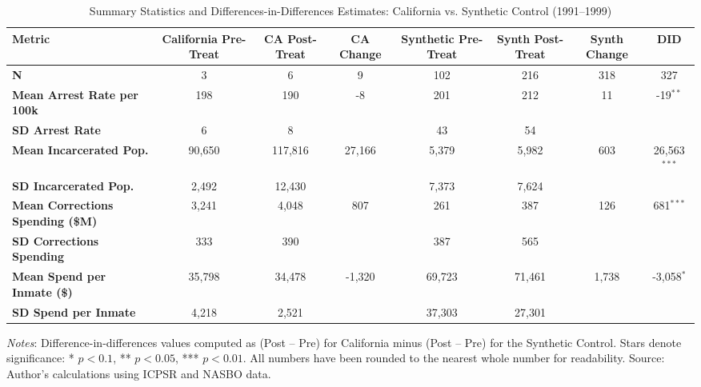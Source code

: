 \documentclass[12pt]{article}
\begin{document}
\begin{landscape}
\begin{center}
\begin{table}[ht]
\scriptsize
\centering
\renewcommand{\arraystretch}{1.2}
\begin{tabular}{lccccccc}
\toprule
\textbf{Metric} & \textbf{California Pre-Treat} & \textbf{CA Post-Treat} & \textbf{CA Change} & \textbf{Synthetic Pre-Treat} & \textbf{Synth Post-Treat} & \textbf{Synth Change} & \textbf{DID} \\
\midrule
\textbf{N} & 3 & 6 & 9 & 102 & 216 & 318 & 327 \\
\textbf{Mean Arrest Rate per 100k} & 198 & 190 & -8 & 201 & 212 & 11 & -19$^{**}$ \\
\textbf{SD Arrest Rate} & 6 & 8 &  & 43 & 54 &  & \\
\textbf{Mean Incarcerated Pop.} & 90,650 & 117,816 & 27,166 & 5,379 & 5,982 & 603 & 26,563$^{***}$ \\
\textbf{SD Incarcerated Pop.} & 2,492 & 12,430 &  & 7,373 & 7,624 &  & \\
\textbf{Mean Corrections Spending (\$M)} & 3,241 & 4,048 & 807 & 261 & 387 & 126 & 681$^{***}$ \\
\textbf{SD Corrections Spending} & 333 & 390 &  & 387 & 565 &  & \\
\textbf{Mean Spend per Inmate (\$)} & 35,798 & 34,478 & -1,320 & 69,723 & 71,461 & 1,738 & -3,058$^{*}$ \\
\textbf{SD Spend per Inmate} & 4,218 & 2,521 &  & 37,303 & 27,301 &  & \\
\bottomrule
\end{tabular}
\caption{Summary Statistics and Differences-in-Differences Estimates: California vs. Synthetic Control (1991–1999)}
\label{tab:did_summary}
\textit{Notes}: Difference-in-differences values computed as (Post – Pre) for California minus (Post – Pre) for the Synthetic Control. Stars denote significance: * $p<0.1$, ** $p<0.05$, *** $p<0.01$. All numbers have been rounded to the nearest whole number for readability. Source: Author’s calculations using ICPSR and NASBO data.
\end{table}
\end{center}
\end{landscape}
\end{document}
